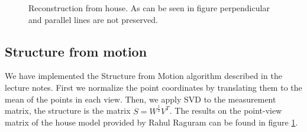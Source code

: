 \documentclass[12pt]{amsart}
\begin{document}
\begin{figure}
\center
{}
\center
{}
\caption{Reconstruction from house. As can be seen in figure  perpendicular and parallel lines are not preserved.}
\label{rec}
\end{figure}

\subsection{Structure from motion}
We have implemented the Structure from Motion algorithm described in the lecture notes. First we normalize the point coordinates by translating them to the mean of the points in each view. Then, we apply SVD to the measurement matrix, the structure is the matrix $S = W^{\frac{1}{2}} V^T$. The results on the point-view matrix of the house model provided by Rahul Raguram can be found in figure \ref{rec}.
\end{document}

